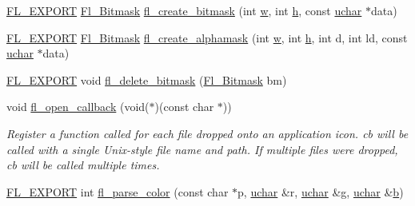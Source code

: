 \begin{DoxyCompactItemize}
\item 
\hyperlink{_fl___export_8_h_aa9ba29a18aee9d738370a06eeb4470fc}{F\+L\+\_\+\+E\+X\+P\+O\+RT} \hyperlink{mac_8_h_a90133b6f8cfb11ab81d83b2c4d91310d}{Fl\+\_\+\+Bitmask} \hyperlink{win32_8_h_a5197adda8c1f9ea113311449789720e9}{fl\+\_\+create\+\_\+bitmask} (int \hyperlink{forms_8_h_aac374e320caaadeca4874add33b62af2}{w}, int \hyperlink{forms_8_h_a7e427ba5b307f9068129699250690066}{h}, const \hyperlink{fl__types_8h_a65f85814a8290f9797005d3b28e7e5fc}{uchar} $\ast$data)
\item 
\hyperlink{_fl___export_8_h_aa9ba29a18aee9d738370a06eeb4470fc}{F\+L\+\_\+\+E\+X\+P\+O\+RT} \hyperlink{mac_8_h_a90133b6f8cfb11ab81d83b2c4d91310d}{Fl\+\_\+\+Bitmask} \hyperlink{win32_8_h_ae12b3364d68f86e9e920fccc9c0b79e3}{fl\+\_\+create\+\_\+alphamask} (int \hyperlink{forms_8_h_aac374e320caaadeca4874add33b62af2}{w}, int \hyperlink{forms_8_h_a7e427ba5b307f9068129699250690066}{h}, int d, int ld, const \hyperlink{fl__types_8h_a65f85814a8290f9797005d3b28e7e5fc}{uchar} $\ast$data)
\item 
\hyperlink{_fl___export_8_h_aa9ba29a18aee9d738370a06eeb4470fc}{F\+L\+\_\+\+E\+X\+P\+O\+RT} void \hyperlink{win32_8_h_a79b34dfedfba622e0626dd5832ca71f2}{fl\+\_\+delete\+\_\+bitmask} (\hyperlink{mac_8_h_a90133b6f8cfb11ab81d83b2c4d91310d}{Fl\+\_\+\+Bitmask} bm)
\item 
void \hyperlink{group__group__macosx_ga0702a54934d10f5b72157137cf291296}{fl\+\_\+open\+\_\+callback} (void($\ast$)(const char $\ast$))
\begin{DoxyCompactList}\small\item\em Register a function called for each file dropped onto an application icon. {\itshape cb} will be called with a single Unix-\/style file name and path. If multiple files were dropped, {\itshape cb} will be called multiple times. \end{DoxyCompactList}\item 
\hyperlink{_fl___export_8_h_aa9ba29a18aee9d738370a06eeb4470fc}{F\+L\+\_\+\+E\+X\+P\+O\+RT} int \hyperlink{win32_8_h_a0a5c5c56a06c3e23e509e6c0125e95e7}{fl\+\_\+parse\+\_\+color} (const char $\ast$p, \hyperlink{fl__types_8h_a65f85814a8290f9797005d3b28e7e5fc}{uchar} \&r, \hyperlink{fl__types_8h_a65f85814a8290f9797005d3b28e7e5fc}{uchar} \&g, \hyperlink{fl__types_8h_a65f85814a8290f9797005d3b28e7e5fc}{uchar} \&\hyperlink{forms_8_h_a0ba06a290a384fa06b1b90745827dae2}{b})
\end{DoxyCompactItemize}
